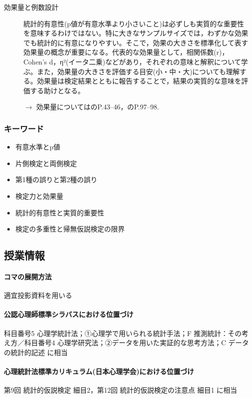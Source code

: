 \begin{description}
	\item[効果量と例数設計] 統計的有意性(p値が有意水準より小さいこと)は必ずしも実質的な重要性を意味するわけではない。特に大きなサンプルサイズでは，わずかな効果でも統計的に有意になりやすい。そこで，効果の大きさを標準化して表す効果量の概念が重要になる。代表的な効果量として，相関係数(r)，Cohen's d，η²(イータ二乗)などがあり，それぞれの意味と解釈について学ぶ。また，効果量の大きさを評価する目安(小・中・大)についても理解する。効果量は検定結果とともに報告することで，結果の実質的な意味を評価する助けとなる。
	      \begin{flushright}
		      $\to$ 効果量については\textcite{Matia201201}のP.43--46，\textcite{Kawabata201408}のP.97--98.
	      \end{flushright}




\end{description}
\subsubsection{キーワード}
\begin{itemize}
	\item 有意水準とp値
	\item 片側検定と両側検定
	\item 第1種の誤りと第2種の誤り
	\item 検定力と効果量
	\item 統計的有意性と実質的重要性
	\item 検定の多重性と帰無仮説検定の限界
\end{itemize}
\subsection{授業情報}
\paragraph{コマの展開方法}
適宜投影資料を用いる
\paragraph{公認心理師標準シラバスにおける位置づけ}
科目番号5 心理学統計法；①心理学で用いられる統計手法；F 推測統計：その考え方／科目番号4 心理学研究法；②データを用いた実証的な思考方法；C データの統計的記述 に相当
\paragraph{心理統計法標準カリキュラム(日本心理学会)における位置づけ}
第9回 統計的仮説検定 細目2，第12回 統計的仮説検定の注意点 細目1 に相当
